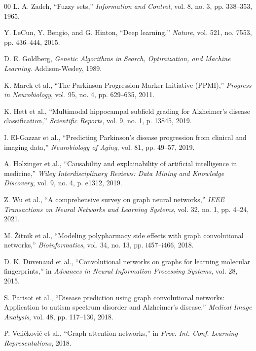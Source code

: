 \documentclass[conference]{IEEEtran}
\begin{document}
\begin{thebibliography}{00}
L. A. Zadeh, ``Fuzzy sets,'' \textit{Information and Control}, vol. 8, no. 3, pp. 338--353, 1965.

Y. LeCun, Y. Bengio, and G. Hinton, ``Deep learning,'' \textit{Nature}, vol. 521, no. 7553, pp. 436--444, 2015.

D. E. Goldberg, \textit{Genetic Algorithms in Search, Optimization, and Machine Learning}. Addison-Wesley, 1989.

K. Marek et al., ``The Parkinson Progression Marker Initiative (PPMI),'' \textit{Progress in Neurobiology}, vol. 95, no. 4, pp. 629--635, 2011.

K. Hett et al., ``Multimodal hippocampal subfield grading for Alzheimer's disease classification,'' \textit{Scientific Reports}, vol. 9, no. 1, p. 13845, 2019.

I. El-Gazzar et al., ``Predicting Parkinson's disease progression from clinical and imaging data,'' \textit{Neurobiology of Aging}, vol. 81, pp. 49--57, 2019.

A. Holzinger et al., ``Causability and explainability of artificial intelligence in medicine,'' \textit{Wiley Interdisciplinary Reviews: Data Mining and Knowledge Discovery}, vol. 9, no. 4, p. e1312, 2019.

Z. Wu et al., ``A comprehensive survey on graph neural networks,'' \textit{IEEE Transactions on Neural Networks and Learning Systems}, vol. 32, no. 1, pp. 4--24, 2021.

M. Žitnik et al., ``Modeling polypharmacy side effects with graph convolutional networks,'' \textit{Bioinformatics}, vol. 34, no. 13, pp. i457--i466, 2018.

D. K. Duvenaud et al., ``Convolutional networks on graphs for learning molecular fingerprints,'' in \textit{Advances in Neural Information Processing Systems}, vol. 28, 2015.

S. Parisot et al., ``Disease prediction using graph convolutional networks: Application to autism spectrum disorder and Alzheimer's disease,'' \textit{Medical Image Analysis}, vol. 48, pp. 117--130, 2018.

P. Veličković et al., ``Graph attention networks,'' in \textit{Proc. Int. Conf. Learning Representations}, 2018.


\end{thebibliography}
\end{document}
